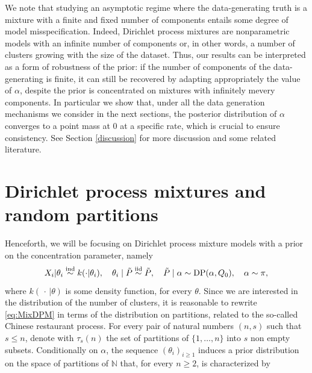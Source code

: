 \documentclass[12pt]{article}
\def\simind{\stackrel{\mbox{\scriptsize{ind}}}{\sim}}
\def\simiid{\stackrel{\mbox{\scriptsize{iid}}}{\sim}}
\begin{document}
We note that studying an asymptotic regime where the data-generating truth is a mixture with a finite and fixed number of components entails some degree of model misspecification. Indeed, Dirichlet process mixtures are nonparametric models with an %
infinite number of components or, in other words, a number of clusters growing with the size of the dataset. Thus, our results can be interpreted as a form of robustness of the prior: if the number of components of the data-generating is finite, it can still be recovered by adapting appropriately the value of $\alpha$, despite the prior is concentrated on mixtures with infinitely mevery components. In particular we show that, under all the data generation mechanisms we consider in the next sections, the posterior distribution of $\alpha$ converges to a point mass at 0 at a specific rate, which is crucial to ensure consistency.
See Section \ref{discussion} for more discussion and some related literature.

\section{Dirichlet process mixtures and random \mbox{partitions}}\label{sec:MM}
Henceforth, we will be focusing on Dirichlet process mixture models with a prior on the concentration parameter, namely %
\begin{equation}\label{eq:MixDPM}
X_i|\theta_i \simind k(\cdot|\theta_i), \quad \theta_i \mid \tilde{P} \simiid \tilde{P}, \quad \tilde{P} \mid \alpha \sim \text{DP}(\alpha,Q_0), \quad \alpha \sim \pi,
\end{equation}
where $k(\,\cdot\,|\theta)$ is some density function, for every $\theta$.
Since we are interested in the distribution of the number of clusters, it is reasonable to rewrite \eqref{eq:MixDPM} in terms of the distribution on partitions, related to the so-called Chinese restaurant process. For every pair of natural numbers $(n, s)$ such that $s\le n$, denote with $\tau_s(n)$ the set of partitions of $\{1,\ldots,n\}$ into $s$ non empty subsets.
Conditionally on $\alpha$, the sequence $(\theta_i)_{i\ge 1}$ induces a prior distribution on the space of partitions of $\mathds{N}$ that, for every $n\ge 2$, is characterized by 
\end{document}
